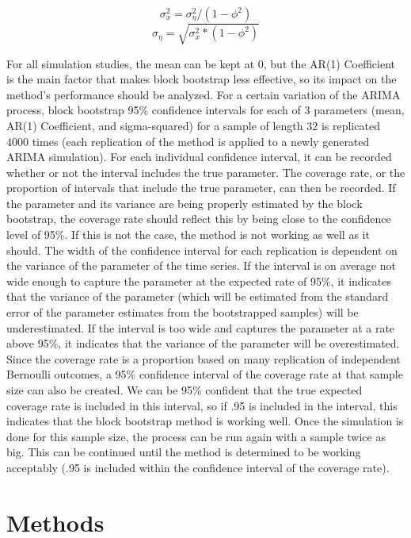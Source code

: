 \documentclass[12pt, letterpaper, titlepage]{article}
\begin{document}
\[ \sigma_{x}^{2}=\sigma_{\eta}^{2}/\left( 1-\phi^2 \right)\]
\[\sigma_{\eta}=\sqrt{\sigma_{x}^{2}*\left( 1-\phi^2 \right)}\]

For all simulation studies, the mean can be kept at 0, but the AR(1) Coefficient is the main factor that makes block bootstrap less effective, so its impact on the method's performance should be analyzed. For a certain variation of the ARIMA process, block bootstrap 95\% confidence intervals for each of 3 parameters (mean, AR(1) Coefficient, and sigma-squared) for a sample of length 32 is replicated 4000 times (each replication of the method is applied to a newly generated ARIMA simulation). For each individual confidence interval, it can be recorded whether or not the interval includes the true parameter. The coverage rate, or the proportion of intervals that include the true parameter, can then be recorded. If the parameter and its variance are being properly estimated by the block bootstrap, the coverage rate should reflect this by being close to the confidence level of 95\%. If this is not the case, the method is not working as well as it should. The width of the confidence interval for each replication is dependent on the variance of the parameter of the time series. If the interval is on average not wide enough to capture the parameter at the expected rate of 95\%, it indicates that the variance of the parameter (which will be estimated from the standard error of the parameter estimates from the bootstrapped samples) will be underestimated. If the interval is too wide and captures the parameter at a rate above 95\%, it indicates that the variance of the parameter will be overestimated. Since the coverage rate is a proportion based on many replication of independent Bernoulli outcomes, a 95\% confidence interval of the coverage rate at that sample size can also be created. We can be 95\% confident that the true expected coverage rate is included in this interval, so if .95 is included in the interval, this indicates that the block bootstrap method is working well. Once the simulation is done for this sample size, the process can be run again with a sample twice as big. This can be continued until the method is determined to be working acceptably (.95 is included within the confidence interval of the coverage rate).

\section{Methods}
\label{sec:methods}
\end{document}
